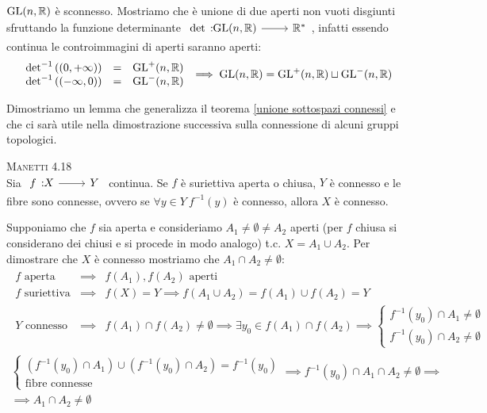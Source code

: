 \begin{observe}
	$\operatorname{GL}(n,\mathbb{R})$ è sconnesso. Mostriamo che è unione di due aperti non vuoti disgiunti sfruttando la funzione determinante $\funz \det {\gl(n,\realset)} {\realset^*}$, infatti essendo continua  le controimmagini di aperti saranno aperti:
		\begin{gather*}
			\begin{array}{lcl}
				\det^{-1} \left( (0,+\infty)\right) & = & \operatorname{GL} ^+ (n,\mathbb{R}) \\ 
				\det^{-1} \left( (-\infty,0)\right) & = & \operatorname{GL} ^- (n,\mathbb{R}) \\
			\end{array}
		\implies \operatorname{GL}(n,\mathbb{R})=\operatorname{GL}^+(n,\mathbb{R}) \sqcup \operatorname{GL}^-(n,\mathbb{R})
		\end{gather*}
	\vspace{-3mm}
\end{observe}
 Dimostriamo un lemma che generalizza il teorema \ref{unione sottospazi connessi}
 e che ci sarà utile nella dimostrazione successiva sulla connessione di alcuni gruppi topologici.
\begin{lemming} \textsc{Manetti 4.18} \\
	Sia $\funz f X Y$ continua. Se $f$ è suriettiva aperta o chiusa, $Y$ è connesso e le fibre sono connesse, ovvero se $\forall y\in Y \ f^{-1}(y)$ è connesso, allora $X$ è connesso.
\end{lemming}
\begin{demonstration}
	Supponiamo che $f$ sia aperta e consideriamo $A_1\neq\emptyset\neq A_2$ aperti (per $f$ chiusa si considerano dei chiusi e si procede in modo analogo) t.c. $X=A_1\cup A_2$. Per dimostrare che $X$ è connesso mostriamo che $A_1\cap A_2\neq\emptyset$:
		\begin{gather*}
			\begin{array}{lcl}
				f \text{ aperta } & \implies & f(A_1), f(A_2) \text{ aperti}\\
				f \text{ suriettiva} & \implies & f(X)=Y \implies f(A_1\cup A_2)=f(A_1)\cup f(A_2)=Y \\
				Y \text{ connesso } & \implies & f(A_1)\cap f(A_2)\neq\emptyset \implies \exists y_0\in f(A_1)\cap f(A_2) \implies \begin{cases} 
					f^{-1}(y_0) \cap A_1\neq \emptyset \\
					f^{-1}(y_0) \cap A_2\neq \emptyset 
				\end{cases}
			\end{array} \\
				\begin{cases}
					\left( f^{-1}(y_0)\cap A_1 \right)\cup \left( f^{-1}(y_0)\cap A_2 \right)=f^{-1}(y_0) \\
					\text{fibre connesse }
				\end{cases}
				 \implies  f^{-1}(y_0)\cap A_1\cap A_2\neq\emptyset\implies\\
				 \implies A_1\cap A_2\neq\emptyset
		\end{gather*}
\end{demonstration}

